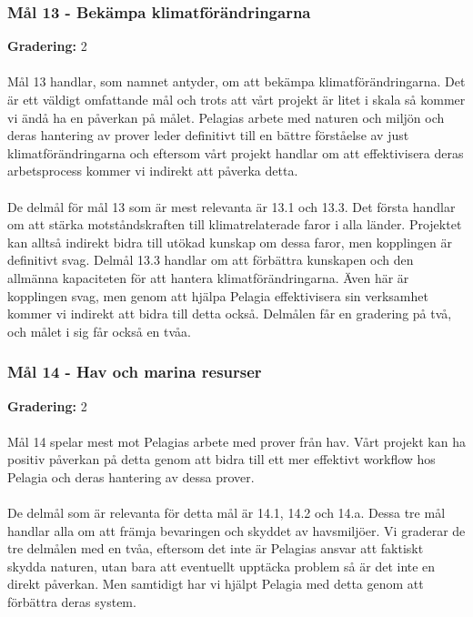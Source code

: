 \subsubsection{Mål 13 - Bekämpa klimatförändringarna}
\textbf{Gradering:} 2 
\\\\
Mål 13 handlar, som namnet antyder, om att bekämpa klimatförändringarna. Det är ett väldigt omfattande mål och trots att vårt projekt är litet i skala så kommer vi ändå ha en påverkan på målet. Pelagias arbete med naturen och miljön och deras hantering av prover leder definitivt till en bättre förståelse av just klimatförändringarna och eftersom vårt projekt handlar om att effektivisera deras arbetsprocess kommer vi indirekt att påverka detta. 
\\\\
De delmål för mål 13 som är mest relevanta är 13.1 och 13.3. Det första handlar om att stärka motståndskraften till klimatrelaterade faror i alla länder. Projektet kan alltså indirekt bidra till utökad kunskap om dessa faror, men kopplingen är definitivt svag. Delmål 13.3 handlar om att förbättra kunskapen och den allmänna kapaciteten för att hantera klimatförändringarna. Även här är kopplingen svag, men genom att hjälpa Pelagia effektivisera sin verksamhet kommer vi indirekt att bidra till detta också. Delmålen får en gradering på två, och målet i sig får också en tvåa.

\subsubsection{Mål 14 - Hav och marina resurser}
\textbf{Gradering:} 2 
\\\\
Mål 14 spelar mest mot Pelagias arbete med prover från hav. Vårt projekt kan ha positiv påverkan på detta genom att bidra till ett mer effektivt workflow hos Pelagia och deras hantering av dessa prover.
\\\\
De delmål som är relevanta för detta mål är 14.1, 14.2 och 14.a. Dessa tre mål handlar alla om att främja bevaringen och skyddet av havsmiljöer. Vi graderar de tre delmålen med en tvåa, eftersom det inte är Pelagias ansvar att faktiskt skydda naturen, utan bara att eventuellt upptäcka problem så är det inte en direkt påverkan. Men samtidigt har vi hjälpt Pelagia med detta genom att förbättra deras system.

